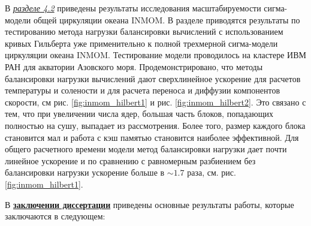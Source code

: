 В \underline{\textit{разделе 4.2}} приведены результаты исследования масштабируемости сигма-модели общей циркуляции океана INMOM.
В разделе приводятся результаты по тестированию метода нагрузки балансировки вычислений с использованием кривых Гильберта уже примени­тельно к полной трехмерной сигма-модели циркуляции океана INMOM. Тестирование модели проводилось на кластере ИВМ РАН для акватории Азовского моря.
Продемонстрировано, что методы балансировки нагрузки вычислений дают сверхлинейное ускорение для расче­тов температуры и солености и для расчета переноса и диффузии компонентов скорости, см рис. \ref{fig:inmom_hilbert1} и рис. \ref{fig:inmom_hilbert2}.
Это связано с тем, что при увеличении числа ядер, большая часть блоков, попадающих полностью на сушу, выпадает из рассмотрения. Более то­го, размер каждого блока становится мал и работа с кэш памятью становится наиболее эффективной.
Для общего расчетного времени модели метод балансировки нагрузки дает почти линейное ускорение и по сравнению с равномерным разбиением без балансировки нагрузки ускорение больше в $\sim 1.7$ раза, см. рис. \ref{fig:inmom_hilbert1}.

\FloatBarrier
{}                                  %
В \underline{\textbf{заключении диссертации}} приведены основные результаты работы, которые заключаются в следующем:




